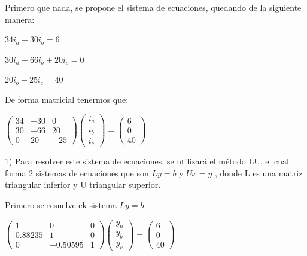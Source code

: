 \documentclass[10pt,twoside]{article}
\begin{document}
\begin{flushleft}
Primero que nada, se propone el sistema de ecuaciones, quedando de la siguiente manera:

\begin{center}
$34i_a - 30i_b = 6$

$30i_a - 66i_b + 20i_c = 0$

$ 20i_b - 25i_c = 40$

\end{center}

De forma matricial tenermos que:
\begin{center}

$
\begin{pmatrix}
  34  & -30 &  0  \\
   30  & -66 &  20  \\
   0 &  20 &  -25 
 \end{pmatrix}
 \begin{pmatrix}
  i_a \\
   i_b \\
   i_c
  \end{pmatrix}
   = \begin{pmatrix}
  6 \\
   0 \\
   40  
  \end{pmatrix}
$
\end{center}

1) Para resolver este sistema de ecuaciones, se utilizará el método LU, el cual forma 2 sistemas de ecuaciones que son
$Ly = b $ y $Ux = y$
, donde L es una matriz triangular inferior y U triangular superior.

\begin{center}
Primero se resuelve ek sistema $Ly = b$:
\vspace{1.5mm}

$
\begin{pmatrix}
  1  & 0 &  0  \\
   0.88235  & 1 &  0  \\
   0 &  -0.50595 &  1 
 \end{pmatrix}
 \begin{pmatrix}
  y_a \\
   y_b \\
   y_c
  \end{pmatrix}
   = \begin{pmatrix}
  6 \\
   0 \\
   40
  \end{pmatrix}
$


\end{center}
\end{flushleft}
\end{document}
